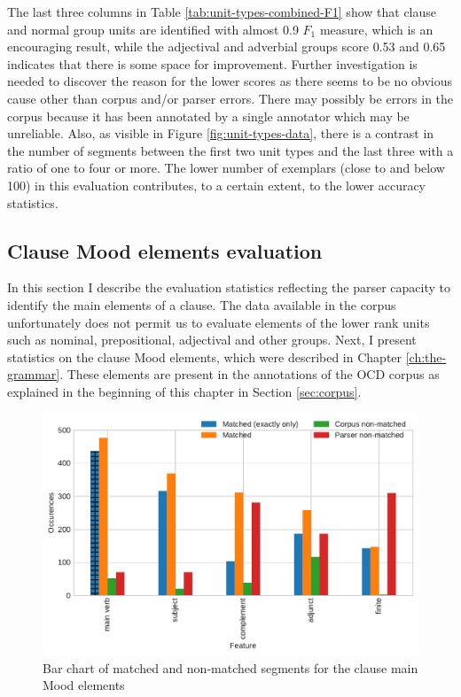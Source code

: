     The last three columns in Table \ref{tab:unit-types-combined-F1} show that clause and normal group units are identified with almost 0.9 $F_1$ measure, which is an encouraging result, while the adjectival and adverbial groups score 0.53 and 0.65 indicates that there is some space for improvement. 
    Further investigation is needed to discover the reason for the lower scores as there seems to be no obvious cause other than corpus and/or parser errors. There may possibly be errors in the corpus because it has been annotated by a single annotator which may be unreliable. Also, as visible in Figure \ref{fig:unit-types-data}, there is a contrast in the number of segments between the first two unit types and the last three with a ratio of one to four or more. The lower number of exemplars (close to and below 100) in this evaluation contributes, to a certain extent, to the lower accuracy statistics.
    
\subsection{Clause Mood elements evaluation}
\label{sec:unit-mood-element-evaluation}

    In this section I describe the evaluation statistics reflecting the parser capacity to identify the main elements of a clause. The data available in the corpus unfortunately does not permit us to evaluate elements of the lower rank units such as nominal, prepositional, adjectival and other groups. Next, I present statistics on the clause Mood elements, which were described in Chapter \ref{ch:the-grammar}. These elements are present in the annotations of the OCD corpus as explained in the beginning of this chapter in Section \ref{sec:corpus}. 
    
    \begin{figure}[!ht]
    \centering
    \includegraphics[width=.85\textwidth]{evaluation-results/figures/unit-elements-mood-data.pdf}
    \caption{Bar chart of matched and non-matched segments for the clause main Mood elements}
    \label{fig:unit-elements-mood-data}
    \end{figure}
    
